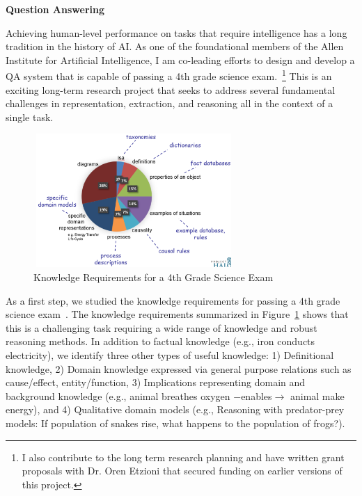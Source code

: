 \documentclass[a4paper,11pt,onecolumn]{article}
\begin{document}
{\bf Question Answering}

Achieving human-level performance on tasks that require intelligence has a long tradition in the history of AI. As one of the foundational members of the Allen Institute for Artificial Intelligence, I am co-leading efforts to design and develop a QA system that is capable of passing a 4th grade science exam.~\footnote{I also contribute to the long term research planning and have written grant proposals with Dr. Oren Etzioni that secured funding on earlier versions of this project.} This is an exciting long-term research project that seeks to address several fundamental challenges in representation, extraction, and reasoning all in the context of a single task. 
\begin{figure}
	\begin{center}
	\includegraphics[width=3in,height=2in]{figures/akbc} 	
	\vspace{-2ex}
	\caption{\label{fig:akbc} {\small Knowledge Requirements for a 4th Grade Science Exam}}
	\vspace{-2ex}
	\end{center}
\end{figure}

As a first step, we studied the knowledge requirements for passing a 4th grade science exam~\cite{clark-akbc13}. The knowledge requirements summarized in Figure~\ref{fig:akbc} shows that this is a challenging task requiring a wide range of knowledge and robust reasoning methods. In addition to factual knowledge (e.g., iron conducts electricity), we identify three other types of useful knowledge: 1) Definitional knowledge, 2) Domain knowledge expressed via general purpose relations such as cause/effect, entity/function, 3) Implications representing domain and background knowledge (e.g., animal breathes oxygen $-$enables$\rightarrow$ animal make energy), and 4) Qualitative domain models (e.g., Reasoning with predator-prey models: If population of snakes rise, what happens to the population of frogs?).
\end{document}
